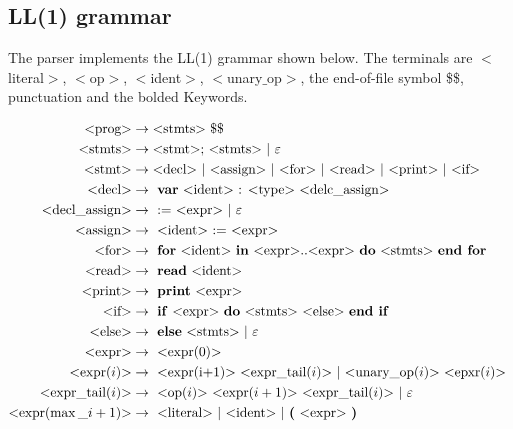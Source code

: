 \documentclass[a4paper]{article}
\begin{document}
\subsection{LL(1) grammar}


\newcommand{\cfgvar}[1]{$<$#1$>$}
\newcommand{\cfgrule}[2]{\text{\cfgvar{#1}} &\rightarrow \text{#2}}
\newcommand{\cfgterm}[1]{\textbf{#1}}
The parser implements the LL(1) grammar shown below.
The terminals are \cfgvar{literal}, \cfgvar{op}, \cfgvar{ident}, 
\cfgvar{unary$\_$op}, the end-of-file symbol \$\$, punctuation 
and the bolded Keywords.

\begin{align*}
  \cfgrule{prog}{\cfgvar{stmts} \$\$} \\
  \cfgrule{stmts}{\cfgvar{stmt}; \cfgvar{stmts} $\mid$ $\varepsilon$} \\
  \cfgrule{stmt}{\cfgvar{decl} $\mid$ 
                 \cfgvar{assign} $\mid$
                 \cfgvar{for} $\mid$ 
                 \cfgvar{read} $\mid$ 
                 \cfgvar{print} $\mid$ 
                 \cfgvar{if} } \\
  \cfgrule{decl}{
    \cfgterm{var} \cfgvar{ident} : \cfgvar{type} \cfgvar{delc\_assign}
  } \\
  \cfgrule{decl\_assign}{
     := \cfgvar{expr} $\mid$ $\varepsilon$
  }\\
  \cfgrule{assign}{
    \cfgvar{ident} := \cfgvar{expr}
  } \\
  \cfgrule{for}{
    \cfgterm{for} \cfgvar{ident} \cfgterm{in} 
    \cfgvar{expr}..\cfgvar{expr} \cfgterm{do} \cfgvar{stmts} 
    \cfgterm{end for}
  } \\
  \cfgrule{read}{
    \cfgterm{read} \cfgvar{ident}
  } \\
  \cfgrule{print}{
    \cfgterm{print} \cfgvar{expr}
  } \\ 
  \cfgrule{if}{
    \cfgterm{if} \cfgvar{expr} \cfgterm{do} \cfgvar{stmts}
    \cfgvar{else} \cfgterm{end if}
  } \\
  \cfgrule{else}{
    \cfgterm{else} \cfgvar{stmts} $\mid$ $\varepsilon$
  } \\
  \cfgrule{expr}{ \cfgvar{expr($0$)} }\\
  \cfgrule{expr($i$)}{ 
    \cfgvar{expr(i+1)} \cfgvar{expr$\_$tail($i$)} 
    $\mid$ \cfgvar{unary$\_$op($i$)} \cfgvar{epxr($i$)}
  } \\
  \cfgrule{expr$\_$tail($i$)}{
    \cfgvar{op($i$)} \cfgvar{expr($i+1$)} \cfgvar{expr$\_$tail($i$)} $\mid$ $\varepsilon$
  } \\
  \cfgrule{expr($\max\_i+1$)}{
    \cfgvar{literal} $\mid$ \cfgvar{ident} 
    $\mid$ \cfgterm{(} \cfgvar{expr} \cfgterm{)}
  } \\
\end{align*}
\end{document}
